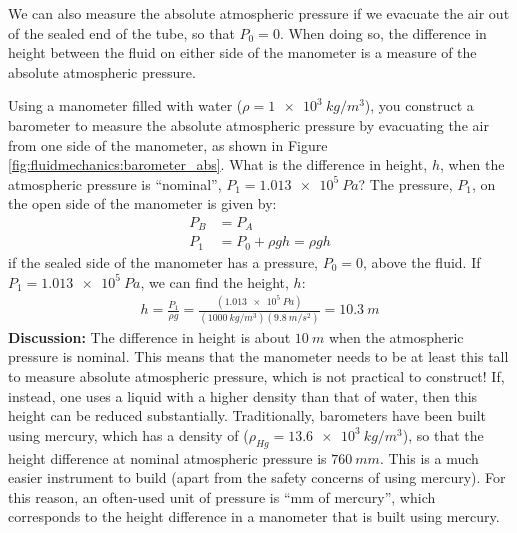 {{We can also measure the absolute atmospheric pressure if we evacuate the air out of the sealed end of the tube, so that $P_0=0$. When doing so, the difference in height between the fluid on either side of the manometer is a measure of the absolute atmospheric pressure.
\vspace{-0.25cm}
\begin{example}{Using a manometer filled with water ($\rho=\SI{1e3}{kg/m^3}$), you construct a barometer to measure the absolute atmospheric pressure by evacuating the air from one side of the manometer, as shown in Figure \ref{fig:fluidmechanics:barometer_abs}. What is the difference in height, $h$, when the atmospheric pressure is ``nominal'', $P_1=\SI{1.013e5}{Pa}$?}
The pressure, $P_1$, on the open side of the manometer is given by:
\begin{align*}
P_B &= P_A\\
P_1&= P_0 + \rho g h = \rho g h
\end{align*}
if the sealed side of the manometer has a pressure, $P_0=0$, above the fluid. If $P_1=\SI{1.013e5}{Pa}$, we can find the height, $h$:
\begin{align*}
h=\frac{P_1}{\rho g}=\frac{(\SI{1.013e5}{Pa})}{(\SI{1000}{kg/m^3})(\SI{9.8}{m/s^2})}=\SI{10.3}{m}
\end{align*}
\textbf{Discussion: }The difference in height is about $\SI{10}{m}$ when the atmospheric pressure is nominal. This means that the manometer needs to be at least this tall to measure absolute atmospheric pressure, which is not practical to construct! If, instead, one uses a liquid with a higher density than that of water, then this height can be reduced substantially. Traditionally, barometers have been built using mercury, which has a density of ($\rho_{Hg}=\SI{13.6e3}{kg/m^3}$), so that the height difference at nominal atmospheric pressure is $\SI{760}{mm}$. This is a much easier instrument to build (apart from the safety concerns of using mercury). For this reason, an often-used unit of pressure is ``mm of mercury'', which corresponds to the height difference in a manometer that is built using mercury. 
\end{example}

}}
